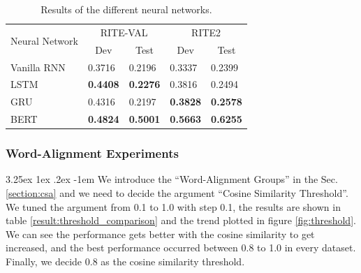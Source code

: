 \documentclass[12pt]{article}
\makeatletter
\renewcommand\paragraph{\@startsection{paragraph}{5}{\z@}%
  {3.25ex \@plus1ex \@minus.2ex}%
  {-1em}%
  {\normalfont\normalsize\bfseries}}
\makeatother
\begin{document}
\begin{CJK*}{UTF8}{bkai}
\begin{spacing}{1.77}
\begin{table}[H]
  \centering
  \setlength{\extrarowheight}{-3pt}
  \begin{tabular}{|l|l|l|l|l|}
  \hline
  \multirow{2}{*}{Neural Network} & \multicolumn{2}{c|}{RITE-VAL} & \multicolumn{2}{c|}{RITE2} \\ \cline{2-5}
   & \multicolumn{1}{c|}{Dev} & \multicolumn{1}{c|}{Test} & \multicolumn{1}{c|}{Dev} & \multicolumn{1}{c|}{Test} \\ \hline
  Vanilla RNN & 0.3716 & 0.2196 & 0.3337 & 0.2399 \\ \hline
  LSTM & \textbf{0.4408} & \textbf{0.2276} & 0.3816 & 0.2494 \\ \hline
  GRU & 0.4316 & 0.2197 & \textbf{0.3828} & \textbf{0.2578} \\ \hline
  BERT & \textbf{0.4824} & \textbf{0.5001} & \textbf{0.5663} & \textbf{0.6255} \\ \hline
  \end{tabular}
  \caption{Results of the different neural networks.}
  \label{result:rnn_types}
\end{table}

\subsubsection{Word-Alignment Experiments}
\paragraph{}
We introduce the ``Word-Alignment Groups'' in the Sec. \ref{section:csa} and we need to decide the argument ``Cosine Similarity Threshold''. We tuned the argument from 0.1 to 1.0 with step 0.1, the results are shown in table \ref{result:threshold_comparison} and the trend plotted in figure \ref{fig:threshold}. We can see the performance gets better with the cosine similarity to get increased, and the best performance occurred between 0.8 to 1.0 in every dataset. Finally, we decide 0.8 as the cosine similarity threshold.


\end{spacing}
\end{CJK*}
\end{document}
